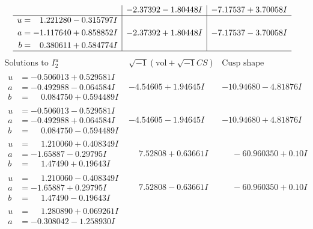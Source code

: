 \documentclass[1p]{elsarticle_modified}
\theoremstyle{definition}
\newcommand{\I}{\sqrt{-1}}
\begin{document}
$$\begin{array}{c|c|c}
 & -2.37392 - 1.80448 I & -7.17537 + 3.70058 I \\ \hline\begin{aligned}
u &= \phantom{-}1.221280 - 0.315797 I \\
a &= -1.117640 + 0.858852 I \\
b &= \phantom{-}0.380611 + 0.584774 I\end{aligned}
 & -2.37392 + 1.80448 I & -7.17537 - 3.70058 I\\
 \hline 
 \end{array}$$\newpage$$\begin{array}{c|c|c}  
\text{Solutions to }I^u_{2}& \I (\text{vol} + \sqrt{-1}CS) & \text{Cusp shape}\\
 \hline 
\begin{aligned}
u &= -0.506013 + 0.529581 I \\
a &= -0.492988 - 0.064584 I \\
b &= \phantom{-}0.084750 + 0.594489 I\end{aligned}
 & -4.54605 + 1.94645 I & -10.94680 - 4.81876 I \\ \hline\begin{aligned}
u &= -0.506013 - 0.529581 I \\
a &= -0.492988 + 0.064584 I \\
b &= \phantom{-}0.084750 - 0.594489 I\end{aligned}
 & -4.54605 - 1.94645 I & -10.94680 + 4.81876 I \\ \hline\begin{aligned}
u &= \phantom{-}1.210060 + 0.408349 I \\
a &= -1.65887 - 0.29795 I \\
b &= \phantom{-}1.47490 + 0.19643 I\end{aligned}
 & \phantom{-}7.52808 + 0.63661 I & \phantom{-}                -6
0.960350 + 0. 10   I\phantom{ +0.000000I} \\ \hline\begin{aligned}
u &= \phantom{-}1.210060 - 0.408349 I \\
a &= -1.65887 + 0.29795 I \\
b &= \phantom{-}1.47490 - 0.19643 I\end{aligned}
 & \phantom{-}7.52808 - 0.63661 I & \phantom{-}                -6
0.960350 + 0. 10   I\phantom{ +0.000000I} \\ \hline\begin{aligned}
u &= \phantom{-}1.280890 + 0.069261 I \\
a &= -0.308042 - 1.258930 I \\

\end{aligned}
\end{array}$$
\end{document}
